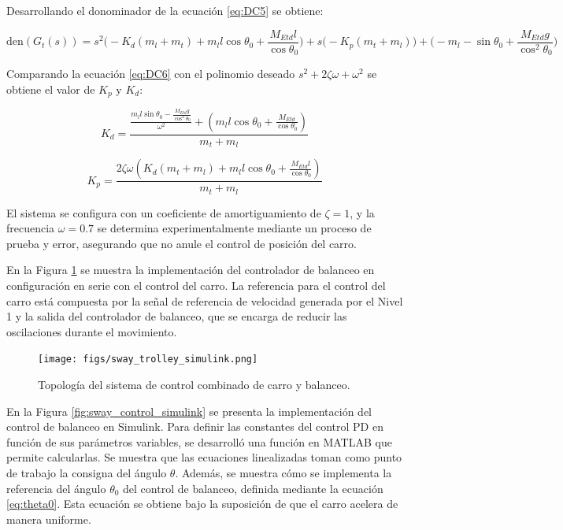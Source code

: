 \documentclass{article}
\begin{document}
        Desarrollando el donominador de la ecuación \ref{eq:DC5} se obtiene:

        
        \begin{equation} \label{eq:DC6}
            \text{den}(G_t(s)) = s^2\bigg(-K_d(m_l+m_t)+m_ll\cos{\theta_0}+\frac{M_{Etd}l}{\cos{\theta_0}}\bigg)+s\bigg(-K_p(m_t+m_l)\bigg)+\bigg( -m_l-\sin{\theta_0}+\frac{M_{Etd}g}{\cos^2{\theta_0}}\bigg) 
        \end{equation}

        Comparando la ecuación \ref{eq:DC6} con el polinomio deseado \(s^2+2\zeta\omega+\omega^2\) se obtiene el valor de \(K_p\) y \(K_d\):

        \begin{equation} \label{eq:DC7}
            K_d=\frac{\frac{m_ll\sin{\theta_0}-\frac{M_{Etd}g}{\cos^2{\theta_0}}}{\omega^2}+\left(m_ll\cos{\theta_0}+\frac{M_{Etd}}{\cos{\theta_0}}\right)}{m_t+m_l}
        \end{equation}

        \begin{equation} \label{eq:DC8}
            K_p=\frac{2\zeta\omega\left(K_d(m_t+m_l)+m_ll\cos{\theta_0}+\frac{M_{Etd}l}{\cos{\theta_0}}\right)}{m_t+m_l}
        \end{equation}

        El sistema se configura con un coeficiente de amortiguamiento de \(\zeta = 1\), y la frecuencia \(\omega = 0.7\) se determina experimentalmente mediante un proceso de prueba y error, asegurando que no anule el control de posición del carro.

        En la Figura \ref{fig:sway_trolley_simulink} se muestra la implementación del controlador de balanceo en configuración en serie con el control del carro. La referencia para el control del carro está compuesta por la señal de referencia de velocidad generada por el Nivel 1 y la salida del controlador de balanceo, que se encarga de reducir las oscilaciones durante el movimiento.

        \begin{figure} [H]
            \centering
            \texttt{[image: figs/sway\_trolley\_simulink.png]}
            \caption{Topología del sistema de control combinado de carro y balanceo.}
            \label{fig:sway_trolley_simulink}
        \end{figure}
        
        En la Figura \ref{fig:sway_control_simulink} se presenta la implementación del control de balanceo en Simulink. Para definir las constantes del control PD en función de sus parámetros variables, se desarrolló una función en MATLAB que permite calcularlas. Se muestra que las ecuaciones linealizadas toman como punto de trabajo la consigna del ángulo \(\theta\). Además, se muestra cómo se implementa la referencia del ángulo \(\theta_0\) del control de balanceo, definida mediante la ecuación \ref{eq:theta0}. Esta ecuación se obtiene bajo la suposición de que el carro acelera de manera uniforme.
\end{document}
